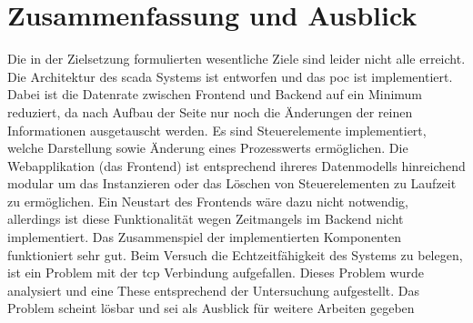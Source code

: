 \chapter{Zusammenfassung und Ausblick}\label{chapter:exit}
Die in der Zielsetzung formulierten wesentliche Ziele  sind leider nicht alle erreicht.
Die Architektur des \ac{scada} Systems ist entworfen und das \ac{poc} ist implementiert.
Dabei ist die Datenrate zwischen Frontend und Backend auf ein Minimum reduziert, 
da nach Aufbau der Seite nur noch die Änderungen der reinen Informationen ausgetauscht werden.
Es sind Steuerelemente implementiert, welche Darstellung sowie Änderung eines Prozesswerts ermöglichen.
Die Webapplikation (das Frontend) ist entsprechend ihreres Datenmodells hinreichend modular um das Instanzieren oder das Löschen von Steuerelementen zu Laufzeit zu ermöglichen.
Ein Neustart des Frontends wäre dazu nicht notwendig, allerdings ist diese Funktionalität wegen Zeitmangels im Backend nicht implementiert.
Das Zusammenspiel der implementierten Komponenten funktioniert sehr gut.
Beim Versuch die Echtzeitfähigkeit des Systems zu belegen, ist ein Problem mit der \ac{tcp} Verbindung aufgefallen.
Dieses Problem wurde analysiert und eine These entsprechend der Untersuchung aufgestellt.
Das Problem scheint lösbar und sei als Ausblick für weitere Arbeiten gegeben